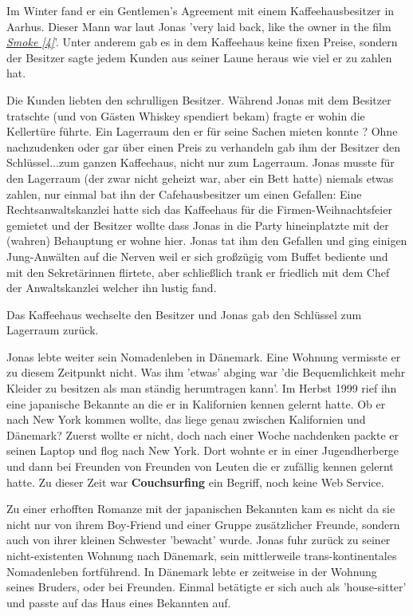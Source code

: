 Im Winter fand er ein Gentlemen’s Agreement mit einem Kaffeehausbesitzer in Aarhus. Dieser Mann war laut Jonas 'very laid back, like the owner in the film \href{http://goo.gl/9ENgMR}{\textit{Smoke [4]}}'. Unter anderem gab es in dem Kaffeehaus keine fixen Preise, sondern der Besitzer sagte jedem Kunden aus seiner Laune heraus wie viel er zu zahlen hat. 

Die Kunden liebten den schrulligen Besitzer. Während Jonas mit dem Besitzer tratschte (und von Gästen Whiskey spendiert bekam) fragte er wohin die Kellertüre führte. Ein Lagerraum den er für seine Sachen mieten konnte ? Ohne nachzudenken oder gar über einen Preis zu verhandeln gab ihm der Besitzer den Schlüssel...zum ganzen Kaffeehaus, nicht nur zum Lagerraum. Jonas musste für den Lagerraum (der zwar nicht geheizt war, aber ein Bett hatte) niemals etwas zahlen, nur einmal bat ihn der Cafehausbesitzer um einen Gefallen:
Eine Rechtsanwaltskanzlei hatte sich das Kaffeehaus für die Firmen-Weihnachtsfeier gemietet und der Besitzer wollte dass Jonas in die Party hineinplatzte mit der (wahren) Behauptung er wohne hier. 
Jonas tat ihm den Gefallen und ging einigen Jung-Anwälten auf die Nerven weil er sich großzügig vom Buffet bediente und mit den Sekretärinnen flirtete, aber schließlich trank er friedlich mit dem Chef der Anwaltskanzlei welcher ihn lustig fand.

Das Kaffeehaus wechselte den Besitzer und Jonas gab den Schlüssel zum Lagerraum zurück. 

Jonas lebte weiter sein Nomadenleben in Dänemark. Eine Wohnung vermisste er zu diesem Zeitpunkt nicht. Was ihm 'etwas' abging war 'die Bequemlichkeit mehr Kleider zu besitzen als man ständig herumtragen kann'. Im Herbst 1999 rief ihn eine japanische Bekannte an die er in Kalifornien kennen gelernt hatte. Ob er nach New York kommen wollte, das liege genau zwischen Kalifornien und Dänemark? Zuerst wollte er nicht, doch nach einer Woche nachdenken packte er seinen Laptop und flog nach New York. Dort wohnte er in einer Jugendherberge und dann bei Freunden von Freunden von Leuten die er zufällig kennen gelernt hatte. Zu dieser Zeit war \textbf{Couchsurfing} ein Begriff, noch keine Web Service.

Zu einer erhofften Romanze mit der japanischen Bekannten kam es nicht da sie nicht nur von ihrem Boy-Friend und einer Gruppe zusätzlicher Freunde, sondern auch von ihrer kleinen Schwester 'bewacht' wurde. Jonas fuhr zurück zu seiner nicht-existenten Wohnung nach Dänemark, sein mittlerweile trans-kontinentales Nomadenleben fortführend. In Dänemark lebte er zeitweise in der Wohnung seines Bruders, oder bei Freunden. Einmal betätigte er sich auch als 'house-sitter' und passte auf das Haus eines Bekannten auf. 

